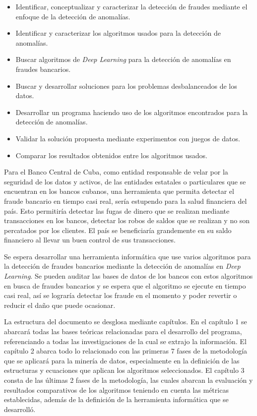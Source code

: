 \begin{itemize}
	\item Identificar, conceptualizar y caracterizar la detecci\'{o}n de fraudes mediante el enfoque de la detecci\'{o}n de anomal\'{i}as.
	\item Identificar y caracterizar los algoritmos usados para la detecci\'{o}n de anomal\'{i}as.
	\item Buscar algoritmos de \textit{Deep Learning} para la detecci\'{o}n de anomal\'{i}as en fraudes bancarios.
	\item Buscar y desarrollar soluciones para los problemas desbalanceados de los datos.
	\item Desarrollar un programa haciendo uso de los algoritmos encontrados para la detecci\'{o}n de anomal\'{i}as.
	\item Validar la soluci\'{o}n propuesta mediante experimentos con juegos de datos.
	\item Comparar los resultados obtenidos entre los algoritmos usados.
\end{itemize}

Para el Banco Central de Cuba, como entidad responsable de velar por la seguridad de los datos y activos, de las entidades estatales o particulares que se encuentran en los bancos cubanos, una herramienta que permita detectar el fraude bancario en tiempo casi real, ser\'{i}a estupendo para la salud financiera del pa\'{i}s. Esto permitir\'{i}a detectar las fugas de dinero que se realizan mediante transacciones en los bancos, detectar los robos de saldos que se realizan y no son percatados por los clientes. El pa\'{i}s se beneficiar\'{i}a grandemente en su saldo financiero al llevar un buen control de sus transacciones.

Se espera desarrollar una herramienta inform\'{a}tica que use varios algoritmos para la detecci\'{o}n de fraudes bancarios mediante la detecci\'{o}n de anomal\'{i}as en \textit{Deep Learning}. Se pueden auditar las bases de datos de los bancos con estos algoritmos en busca de fraudes bancarios y se espera que el algoritmo se ejecute en tiempo casi real, as\'{i} se lograr\'{i}a detectar los fraude en el momento y poder revertir o reducir el da\~{n}o que puede ocasionar.

La estructura del documento se desglosa mediante cap\'{i}tulos. En el cap\'{i}tulo 1 se abarcar\'{a} todas las bases te\'{o}ricas relacionadas para el desarrollo del programa, referenciando a todas las investigaciones de la cual se extrajo la informaci\'{o}n. El cap\'{i}tulo 2 abarca todo lo relacionado con las primeras 7 fases de la metodolog\'{i}a que se aplicar\'{a} para la miner\'{i}a de datos, especialmente en la definici\'{o}n de las estructuras y ecuaciones que aplican los algoritmos seleccionados. El cap\'{i}tulo 3 consta de las \'{u}ltimas 2 fases de la metodolog\'{i}a, las cuales abarcan la evaluaci\'{o}n y resultados comparativos de los algoritmos teniendo en cuenta las m\'{e}tricas establecidas, adem\'{a}s de la definici\'{o}n de la herramienta inform\'{a}tica que se desarroll\'{o}.